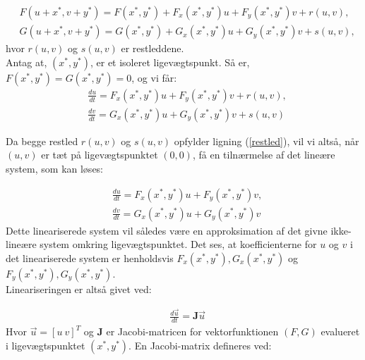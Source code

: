 \begin{equation*}
    \begin{aligned}
    &F(u+x^*,v+y^*)=F(x^*,y^*)+F_x(x^*,y^*)u+F_y(x^*,y^*)v+r(u,v),\\ 
    &G(u+x^*,v+y^*)=G(x^*,y^*)+G_x(x^*,y^*)u+G_y(x^*,y^*)v+s(u,v),
    \end{aligned}
\end{equation*}
hvor $r(u,v)$ og $s(u,v)$  er restleddene. \\
Antag at, $(x^*,y^*)$, er et isoleret ligevægtspunkt. Så er,  $F(x^*,y^*)=G(x^*,y^*)=0$, og vi får:
\begin{equation*}
    \begin{aligned}
    &\frac{du}{dt}=F_x(x^*,y^*)u+F_y(x^*,y^*)v+r(u,v),\\ 
    &\frac{dv}{dt}=G_x(x^*,y^*)u+G_y(x^*,y^*)v+s(u,v)
    \end{aligned}
\end{equation*}

Da begge restled $r(u,v)$ og $s(u,v)$ opfylder ligning (\ref{restled}), vil vi altså, når $(u,v)$ er tæt på ligevægtspunktet $(0,0)$, få en tilnærmelse af det lineære system, som kan løses:

\begin{equation*}
    \begin{aligned}
    &\frac{du}{dt}=F_x(x^*,y^*)u+F_y(x^*,y^*)v,\\ 
    &\frac{dv}{dt}=G_x(x^*,y^*)u+G_y(x^*,y^*)v
    \end{aligned}
\end{equation*}
Dette lineariserede system vil således være en approksimation af det givne ikke-lineære system omkring ligevægtspunktet.
Det ses, at koefficienterne for $u$ og $v$ i det lineariserede system er henholdsvis $F_x(x^*,y^*),G_x(x^*,y^*)$ og $F_y(x^*,y^*),G_y(x^*,y^*)$. \\
Lineariseringen er altså givet ved:

\begin{equation*}
    \begin{aligned}
    &\frac{d\vec{u}}{dt}=\textbf{J}\vec{u}
    \end{aligned}
\end{equation*}
Hvor $\vec{u}=[u \ v]^T$ og $\textbf{J}$ er Jacobi-matricen for vektorfunktionen $(F,G)$ evalueret i ligevægtspunktet $(x^*,y^*)$. En Jacobi-matrix defineres ved:


